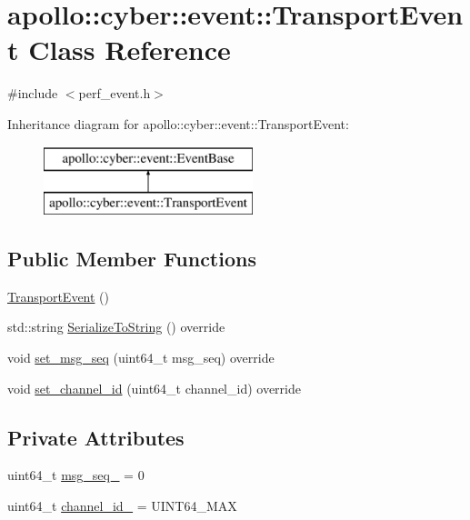 \hypertarget{classapollo_1_1cyber_1_1event_1_1TransportEvent}{\section{apollo\-:\-:cyber\-:\-:event\-:\-:Transport\-Event Class Reference}
\label{classapollo_1_1cyber_1_1event_1_1TransportEvent}
}


{\ttfamily \#include $<$perf\-\_\-event.\-h$>$}

Inheritance diagram for apollo\-:\-:cyber\-:\-:event\-:\-:Transport\-Event\-:\begin{figure}[H]
\begin{center}
\leavevmode
\includegraphics[height=2.000000cm]{classapollo_1_1cyber_1_1event_1_1TransportEvent}
\end{center}
\end{figure}
\subsection*{Public Member Functions}
\begin{DoxyCompactItemize}
\item 
\hyperlink{classapollo_1_1cyber_1_1event_1_1TransportEvent_ac772603bc241d2dc0f037325e7e785ed}{Transport\-Event} ()
\item 
std\-::string \hyperlink{classapollo_1_1cyber_1_1event_1_1TransportEvent_ac006e30964aa5ddf8325a2a4187474b9}{Serialize\-To\-String} () override
\item 
void \hyperlink{classapollo_1_1cyber_1_1event_1_1TransportEvent_a0a3297ffaaabc6127133714209bb0c6f}{set\-\_\-msg\-\_\-seq} (uint64\-\_\-t msg\-\_\-seq) override
\item 
void \hyperlink{classapollo_1_1cyber_1_1event_1_1TransportEvent_a474cc7b64211525b00a5fd4f2238fd51}{set\-\_\-channel\-\_\-id} (uint64\-\_\-t channel\-\_\-id) override
\end{DoxyCompactItemize}
\subsection*{Private Attributes}
\begin{DoxyCompactItemize}
\item 
uint64\-\_\-t \hyperlink{classapollo_1_1cyber_1_1event_1_1TransportEvent_a758b86060a07b28a79c70d6ce8a832d9}{msg\-\_\-seq\-\_\-} = 0
\item 
uint64\-\_\-t \hyperlink{classapollo_1_1cyber_1_1event_1_1TransportEvent_af51920d21d6e09ef4fb6c685c7293358}{channel\-\_\-id\-\_\-} = U\-I\-N\-T64\-\_\-\-M\-A\-X
\end{DoxyCompactItemize}

